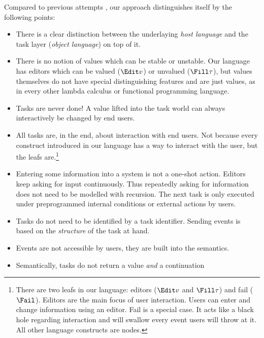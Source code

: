 Compared to previous attempts \cite{conf/ifl/KoopmanPA08,conf/ppdp/PlasmeijerLMAK12,theses/radboud/VinterHviid18},
our approach distinguishes itself by the following points:
\begin{itemize}
  \item
    There is a clear distinction between the underlaying \emph{host language}
    and the task layer (\emph{object language}) on top of it.
  \item
    There is no notion of values which can be stable or unstable.
    Our language has editors which can be valued ($\Edit v$) or unvalued ($\Fill \tau$),
    but values themselves do not have special distinguishing features and are just values,
    as in every other lambda calculus or functional programming language.
  \item
    Tasks are never done!
    A value lifted into the task world can always interactively be changed by end users.
  \item
    All tasks are, in the end, about interaction with end users.
    Not because every construct introduced in our language has a way to interact with the user,
    but the leafs are.\footnote{
      There are two leafs in our language: editors ($\Edit v$ and $\Fill \tau$) and fail ($\Fail$).
      Editors are the main focus of user interaction.
      Users can enter and change information using an editor.
      Fail is a special case.
      It acts like a black hole regarding interaction and will swallow every event users will throw at it.
      All other language constructs are nodes.
    }
  \item
    Entering some information into a system is not a one-shot action.
    Editors keep asking for input continuously.
    Thus repeatedly asking for information does not need to be modelled with recursion.
    The next task is only executed under preprogrammed internal conditions or external actions by users.
  \item
    Tasks do not need to be identified by a task identifier.
    Sending events is based on the \emph{structure} of the task at hand.
  \item
    Events are not accessible by users, they are built into the semantics.
  \item
    Semantically, tasks do not return a value \emph{and} a continuation

\end{itemize}
